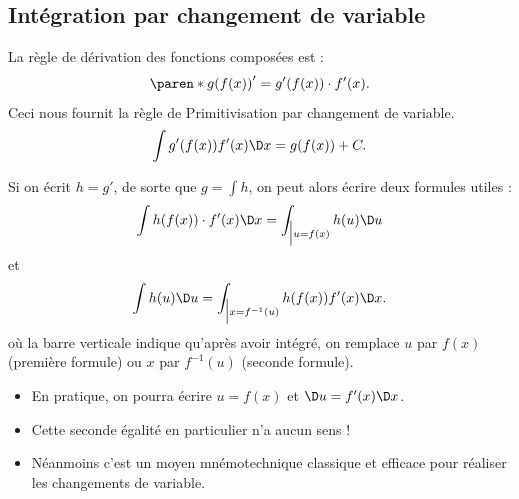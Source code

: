 \subsection{Intégration par changement de variable}
\begin{frame}
  La règle de dérivation des fonctions composées est :
  \begin{equation*}
    \paren*{ g(f(x)) }' = g'(f(x)) \cdot f'(x).
  \end{equation*}
  Ceci nous fournit la règle de \og Primitivisation par changement de variable\fg{}.
  \begin{equation*}
    \int g'(f(x)) f'(x)\D x = g(f(x)) + C.
  \end{equation*}
\end{frame}


\begin{frame}
  Si on écrit \( h = g'\), de sorte que \(g  = \int h\), on peut alors écrire deux formules utiles :\pause{}
  \begin{equation*}
    \int h(f(x)) \cdot f'(x) \D x = \int_{\Big\vert u = f(x)} h(u) \D u
  \end{equation*}
  et\pause{}
  \begin{equation*}
    \int h(u) \D u = \int_{\Big\vert x=f^{-1}(u)} h(f(x)) f'(x) \D x.
  \end{equation*}
  où la barre verticale indique qu'après avoir intégré, on remplace \(u\) par \(f(x)\) (première formule) ou \(x\) par \(f^{-1}(u)\) (seconde formule).
\end{frame}

\begin{frame}
  \begin{itemize}[<+->]
  \item En pratique, on pourra écrire \(u = f(x)\) et \(\D u = f'(x) \D x\).

  \item Cette seconde égalité en particulier n'a aucun sens !

  \item Néanmoins c'est un moyen mnémotechnique classique et efficace pour réaliser les changements de variable.
  \end{itemize}
\end{frame}

